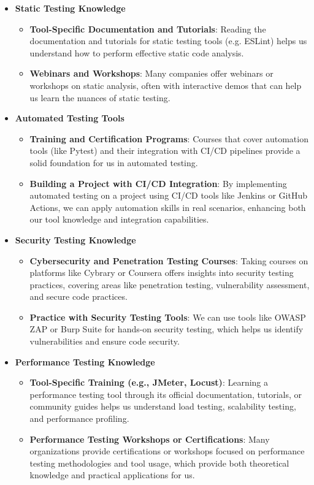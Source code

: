 \documentclass[12pt, titlepage]{article}
\begin{document}
\begin{enumerate}
\begin{itemize}
    \item \textbf{Static Testing Knowledge}
    \begin{itemize}
        \item \textbf{Tool-Specific Documentation and Tutorials}: Reading the documentation and tutorials for static testing tools (e.g. ESLint) helps us understand how to perform effective static code analysis.
        \item \textbf{Webinars and Workshops}: Many companies offer webinars or workshops on static analysis, often with interactive demos that can help us learn the nuances of static testing.
    \end{itemize}

    \item \textbf{Automated Testing Tools}
    \begin{itemize}
        \item \textbf{Training and Certification Programs}: Courses that cover automation tools (like Pytest) and their integration with CI/CD pipelines provide a solid foundation for us in automated testing.
        \item \textbf{Building a Project with CI/CD Integration}: By implementing automated testing on a project using CI/CD tools like Jenkins or GitHub Actions, we can apply automation skills in real scenarios, enhancing both our tool knowledge and integration capabilities.
    \end{itemize}

    \item \textbf{Security Testing Knowledge}
    \begin{itemize}
        \item \textbf{Cybersecurity and Penetration Testing Courses}: Taking courses on platforms like Cybrary or Coursera offers insights into security testing practices, covering areas like penetration testing, vulnerability assessment, and secure code practices.
        \item \textbf{Practice with Security Testing Tools}: We can use tools like OWASP ZAP or Burp Suite for hands-on security testing, which helps us identify vulnerabilities and ensure code security.
    \end{itemize}

    \item \textbf{Performance Testing Knowledge}
    \begin{itemize}
        \item \textbf{Tool-Specific Training (e.g., JMeter, Locust)}: Learning a performance testing tool through its official documentation, tutorials, or community guides helps us understand load testing, scalability testing, and performance profiling.
        \item \textbf{Performance Testing Workshops or Certifications}: Many organizations provide certifications or workshops focused on performance testing methodologies and tool usage, which provide both theoretical knowledge and practical applications for us.
    \end{itemize}


\end{itemize}
\end{enumerate}
\end{document}
